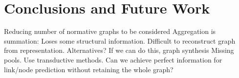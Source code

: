 \section{Conclusions and Future Work}
Reducing number of normative graphs to be considered \newline
Aggregation is summation: Loses some structural information. Difficult to reconstruct graph from representation. Alternatives? If we can do this, graph synthesis \newline
Missing pools. Use transductive methods. \newline
Can we achieve perfect information for link/node prediction without retaining the whole graph? \newline


